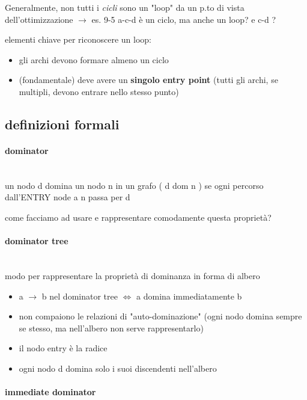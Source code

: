 Generalmente, non tutti i \textit{cicli} sono un "loop" da un p.to di vista dell'ottimizzazione $\rightarrow$ es. 9-5 a-c-d \`e un ciclo, ma anche un loop? e c-d ?

elementi chiave per riconoscere un loop:
\begin{itemize}
  \item gli archi devono formare almeno un ciclo
  \item (fondamentale) deve avere un \textbf{singolo entry point} (tutti gli archi, se multipli, devono entrare nello stesso punto)
\end{itemize}

\subsection{definizioni formali}

\paragraph{dominator}~\\

un nodo d domina un nodo n in un grafo ( d dom n ) se ogni percorso dall'ENTRY node a n passa per d

come facciamo ad usare e rappresentare comodamente questa propriet\`a?

\paragraph{dominator tree}~\\

modo per rappresentare la propriet\`a di dominanza in forma di albero

\begin{itemize}
  \item a $\rightarrow$ b nel dominator tree $\iff$ a domina immediatamente b
  \item non compaiono le relazioni di "auto-dominazione" (ogni nodo domina sempre se stesso, ma nell'albero non serve rappresentarlo)
  \item il nodo entry \`e la radice
  \item ogni nodo d domina solo i suoi discendenti nell'albero
\end{itemize}

\paragraph{immediate dominator}~\\

